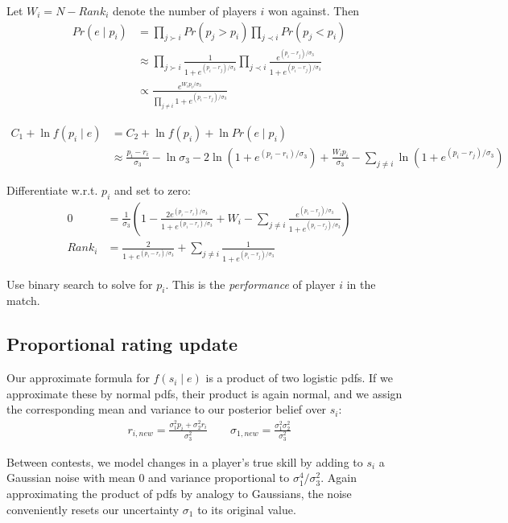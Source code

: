\documentclass{article}
\begin{document}
Let $W_i = N - Rank_i$ denote the number of players $i$ won against. Then
\begin{align}
Pr(e\mid p_i) &= \prod_{j \succ i} Pr(p_j > p_i) \prod_{j \prec i} Pr(p_j < p_i)
\\&\approx \prod_{j \succ i} \frac {1} {1 + e^{(p_i-r_j)/\sigma_3}} \prod_{j \prec i} \frac {e^{(p_i-r_j)/\sigma_3}} {1 + e^{(p_i-r_j)/\sigma_3}}
\\&\propto \frac {e^{W_ip_i/\sigma_3}} {\prod_{j\neq i} 1 + e^{(p_i-r_j)/\sigma_3}}
\end{align}

\begin{align}
C_1 + \ln f(p_i\mid e) &= C_2 + \ln f(p_i) + \ln Pr(e\mid p_i)
\\&\approx \frac{p_i-r_i}{\sigma_3} - \ln \sigma_3 - 2\ln\left(1 + e^{(p_i-r_i)/\sigma_3} \right) + \frac{W_ip_i}{\sigma_3} - \sum_{j\neq i} \ln\left(1 + e^{(p_i-r_j)/\sigma_3}\right)
\end{align}

Differentiate w.r.t. $p_i$ and set to zero:
\begin{align}
0 &= \frac{1}{\sigma_3} \left( 1 - \frac {2e^{(p_i-r_i)/\sigma_3}} {1 + e^{(p_i-r_i)/\sigma_3}} + W_i - \sum_{j\neq i} \frac {e^{(p_i-r_j)/\sigma_3}} {1 + e^{(p_i-r_j)/\sigma_3}} \right)
\\Rank_i &= \frac {2} {1 + e^{(p_i-r_i)/\sigma_3}} + \sum_{j\neq i} \frac {1} {1 + e^{(p_i-r_j)/\sigma_3}}
\end{align}

Use binary search to solve for $p_i$. This is the \emph{performance} of player $i$ in the match.

\subsection{Proportional rating update}

Our approximate formula for $f(s_i \mid e)$ is a product of two logistic pdfs. If we approximate these by normal pdfs, their product is again normal, and we assign the corresponding mean and variance to our posterior belief over $s_i$:
\begin{align}
r_{i,new} = \frac{\sigma_1^2p_i + \sigma_2^2r_i}{\sigma_3^2} \qquad \sigma_{1,new} = \frac{\sigma_1^2\sigma_2^2}{\sigma_3^2}
\end{align}

Between contests, we model changes in a player's true skill by adding to $s_i$ a Gaussian noise with mean $0$ and variance proportional to $\sigma_1^4 / \sigma_3^2$. Again approximating the product of pdfs by analogy to Gaussians, the noise conveniently resets our uncertainty $\sigma_1$ to its original value.
\end{document}
